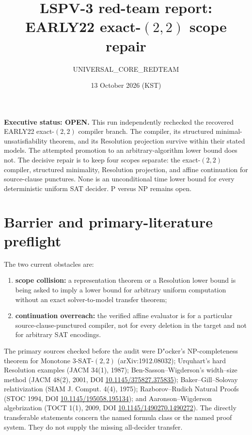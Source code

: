 \documentclass[11pt]{article}
\title{LSPV-3 red-team report: EARLY22 exact-$(2,2)$ scope repair}
\author{UNIVERSAL\_CORE\_REDTEAM}
\date{13 October 2026 (KST)}
\begin{document}
\maketitle

\noindent\textbf{Executive status: OPEN.}
This run independently rechecked the recovered EARLY22 exact-$(2,2)$
compiler branch.  The compiler, its structured minimal-unsatisfiability
theorem, and its Resolution projection survive within their stated models.
The attempted promotion to an arbitrary-algorithm lower bound does not.
The decisive repair is to keep four scopes separate: the exact-$(2,2)$
compiler, structured minimality, Resolution projection, and affine
continuation for source-clause punctures.  None is an unconditional time
lower bound for every deterministic uniform SAT decider.  P versus NP remains
open.

\section{Barrier and primary-literature preflight}

The two current obstacles are:
\begin{enumerate}
  \item \textbf{scope collision:} a representation theorem or a Resolution
  lower bound is being asked to imply a lower bound for arbitrary uniform
  computation without an exact solver-to-model transfer theorem;
  \item \textbf{continuation overreach:} the verified affine evaluator is for
  a particular source-clause-punctured compiler, not for every deletion in
  the target and not for arbitrary SAT encodings.
\end{enumerate}

The primary sources checked before the audit were D{"o}cker's NP-completeness
theorem for Monotone 3-SAT-$(2,2)$ (arXiv:1912.08032); Urquhart's hard
Resolution examples (JACM 34(1), 1987); Ben-Sasson--Wigderson's
width--size method (JACM 48(2), 2001, DOI
\href{https://doi.org/10.1145/375827.375835}{10.1145/375827.375835});
Baker--Gill--Solovay relativization (SIAM J. Comput. 4(4), 1975);
Razborov--Rudich Natural Proofs (STOC 1994, DOI
\href{https://doi.org/10.1145/195058.195134}{10.1145/195058.195134}); and
Aaronson--Wigderson algebrization (TOCT 1(1), 2009, DOI
\href{https://doi.org/10.1145/1490270.1490272}{10.1145/1490270.1490272}).
The directly transferable statements concern the named formula class or the
named proof system.  They do not supply the missing all-decider transfer.
\end{document}
